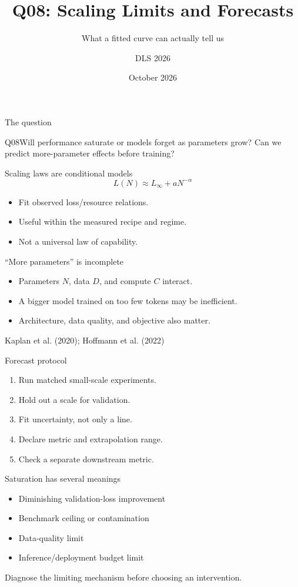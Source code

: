 \documentclass[aspectratio=169,10pt]{beamer}\usetheme{metropolis}\title{Q08: Scaling Limits and Forecasts}\subtitle{What a fitted curve can actually tell us}\author{DLS 2026}\date{October 2026}
\begin{document}
\maketitle
\begin{frame}{The question}\begin{block}{Q08}Will performance saturate or models forget as parameters grow? Can we predict more-parameter effects before training?\end{block}\end{frame}
\begin{frame}{Scaling laws are conditional models}\[L(N)\approx L_\infty+aN^{-\alpha}\]\begin{itemize}\item Fit observed loss/resource relations.\item Useful within the measured recipe and regime.\item Not a universal law of capability.\end{itemize}\end{frame}
\begin{frame}{``More parameters'' is incomplete}\begin{itemize}\item Parameters $N$, data $D$, and compute $C$ interact.\item A bigger model trained on too few tokens may be inefficient.\item Architecture, data quality, and objective also matter.\end{itemize}\vfill\small Kaplan et al. (2020); Hoffmann et al. (2022)\end{frame}
\begin{frame}{Forecast protocol}\begin{enumerate}\item Run matched small-scale experiments.\item Hold out a scale for validation.\item Fit uncertainty, not only a line.\item Declare metric and extrapolation range.\item Check a separate downstream metric.\end{enumerate}\end{frame}
\begin{frame}{Saturation has several meanings}\begin{itemize}\item Diminishing validation-loss improvement\item Benchmark ceiling or contamination\item Data-quality limit\item Inference/deployment budget limit\end{itemize}\alert{Diagnose the limiting mechanism before choosing an intervention.}\end{frame}
\end{document}
